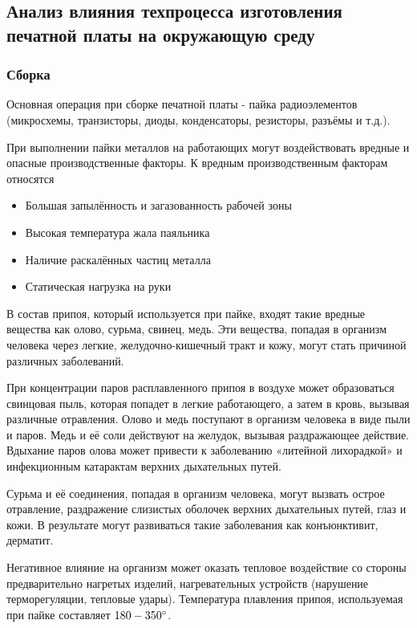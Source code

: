 \newpage

\subsection{Анализ влияния техпроцесса изготовления печатной платы на окружающую среду}

\subsubsection{Сборка}

Основная операция при сборке печатной платы - пайка радиоэлементов (микросхемы, транзисторы, диоды, конденсаторы, резисторы, разъёмы и т.д.).

При выполнении пайки металлов на работающих могут воздействовать вредные и опасные производственные факторы. К вредным производственным факторам относятся
\begin{itemize}
    \item Большая запылённость и загазованность рабочей зоны
    \item Высокая температура жала паяльника
    \item Наличие раскалённых частиц металла
    \item Статическая нагрузка на руки
\end{itemize}

В состав припоя, который используется при пайке, входят такие вредные вещества
как олово, сурьма, свинец, медь. Эти вещества, попадая в организм человека через
легкие, желудочно-кишечный тракт и кожу, могут стать причиной различных заболеваний.

При концентрации паров расплавленного припоя в воздухе может образоваться
свинцовая пыль, которая попадет в легкие работающего, а затем в кровь, вызывая
различные отравления. Олово и медь поступают в организм человека в виде пыли и
паров. Медь и её соли действуют на желудок, вызывая раздражающее действие.
Вдыхание паров олова может привести к заболеванию «литейной лихорадкой» и
инфекционным катарактам верхних дыхательных путей.

Сурьма и её соединения, попадая в организм человека, могут вызвать острое
отравление, раздражение слизистых оболочек верхних дыхательных путей, глаз и кожи.
В результате могут развиваться такие заболевания как конъюнктивит, дерматит.

Негативное влияние на организм может оказать тепловое воздействие со стороны
предварительно нагретых изделий, нагревательных устройств (нарушение терморегуляции,
тепловые удары). Температура плавления припоя, используемая при пайке составляет
$180 - 350 \degree$.

